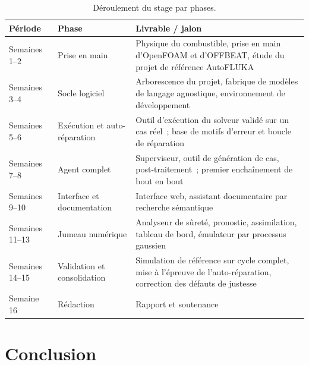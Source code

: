 \documentclass[12pt,a4paper,french]{report}
\begin{document}
\begin{table}[htbp]
\centering
\caption[Déroulement du stage par phases]{Déroulement du stage par phases.}
\label{tab:planning}
\small
\begin{tabularx}{\textwidth}{@{}>{\raggedright\arraybackslash}p{2.6cm}
                                >{\raggedright\arraybackslash}p{4.3cm}X@{}}
\toprule
\textbf{Période} & \textbf{Phase} & \textbf{Livrable / jalon}\\
\midrule
Semaines 1--2 & Prise en main
  & Physique du combustible, prise en main d'OpenFOAM et d'OFFBEAT,
    étude du projet de référence AutoFLUKA\\
\addlinespace
Semaines 3--4 & Socle logiciel
  & Arborescence du projet, fabrique de modèles de langage agnostique,
    environnement de développement\\
\addlinespace
Semaines 5--6 & Exécution et auto-réparation
  & Outil d'exécution du solveur validé sur un cas réel~; base de motifs
    d'erreur et boucle de réparation\\
\addlinespace
Semaines 7--8 & Agent complet
  & Superviseur, outil de génération de cas, post-traitement~;
    premier enchaînement de bout en bout\\
\addlinespace
Semaines 9--10 & Interface et documentation
  & Interface web, assistant documentaire par recherche sémantique\\
\addlinespace
Semaines 11--13 & Jumeau numérique
  & Analyseur de sûreté, pronostic, assimilation, tableau de bord,
    émulateur par processus gaussien\\
\addlinespace
Semaines 14--15 & Validation et consolidation
  & Simulation de référence sur cycle complet, mise à l'épreuve de
    l'auto-réparation, correction des défauts de justesse\\
\addlinespace
Semaine 16 & Rédaction
  & Rapport et soutenance\\
\bottomrule
\end{tabularx}
\end{table}

\clearpage

\chapter*{Conclusion}
\end{document}
